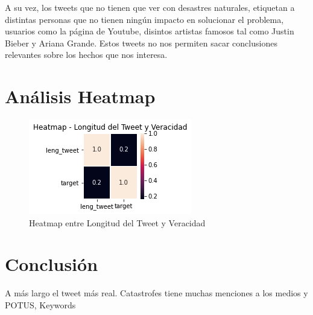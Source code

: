 \documentclass[]{article}
\begin{document}
A su vez, los tweets que no tienen que ver con desastres naturales, etiquetan a distintas personas que no tienen ning\'un impacto en solucionar el problema, usuarios como la p\'agina de Youtube, disintos artistas famosos tal como Justin Bieber y Ariana Grande. Estos tweets no nos permiten sacar conclusiones relevantes sobre los hechos que nos interesa.

\section{An\'alisis Heatmap}

 \begin{figure}[H]
	
	\includegraphics[width=0.70\linewidth]{heatmap}
	\caption[]{Heatmap entre Longitud del Tweet y Veracidad}
\end{figure}
\section{Conclusi\'on}

A más largo el tweet más real. 
Catastrofes tiene muchas menciones a los medios y POTUS, 
Keywords
\end{document}
